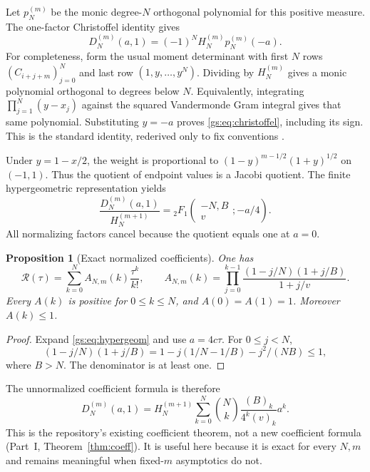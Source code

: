 \documentclass[11pt,a4paper]{article}
\numberwithin{equation}{section}
\newtheorem{proposition}[theorem]{Proposition}
\theoremstyle{definition}
\theoremstyle{remark}
\newcommand{\Rgs}{\mathcal R}
\begin{document}
Let $p_N^{(m)}$ be the monic degree-$N$ orthogonal polynomial for this
positive measure. The one-factor Christoffel identity gives
\begin{equation}\label{gs:eq:christoffel}
 D_N^{(m)}(a,1)=(-1)^N H_N^{(m)}p_N^{(m)}(-a).
\end{equation}
For completeness, form the usual moment determinant with first $N$ rows
$(C_{i+j+m})_{j=0}^N$ and last row $(1,y,\ldots,y^N)$. Dividing by
$H_N^{(m)}$ gives a monic polynomial orthogonal to degrees below $N$.
Equivalently, integrating $\prod_{j=1}^N(y-x_j)$ against the squared
Vandermonde Gram integral gives that same polynomial. Substituting $y=-a$
proves \eqref{gs:eq:christoffel}, including its sign. This is the standard
identity, rederived only to fix conventions \cite{Krattenthaler2023}.

Under $y=1-x/2$, the weight is proportional to
$(1-y)^{m-1/2}(1+y)^{1/2}$ on $(-1,1)$. Thus the quotient of endpoint
values is a Jacobi quotient. The finite hypergeometric representation
\cite[18.5.7]{DLMF} yields
\begin{equation}\label{gs:eq:hypergeom}
 \frac{D_N^{(m)}(a,1)}{H_N^{(m+1)}}
 ={}_2F_1\!\left(\begin{matrix}-N,B\\v\end{matrix};-a/4\right).
\end{equation}
All normalizing factors cancel because the quotient equals one at $a=0$.

\begin{proposition}[Exact normalized coefficients]\label{gs:prop:coefficients}
One has
\begin{equation}\label{gs:eq:coefficients}
 \Rgs(\tau)=\sum_{k=0}^N A_{N,m}(k)\frac{\tau^k}{k!},\qquad
 A_{N,m}(k)=\prod_{j=0}^{k-1}
       \frac{(1-j/N)(1+j/B)}{1+j/v}.
\end{equation}
Every $A(k)$ is positive for $0\le k\le N$, and $A(0)=A(1)=1$.
Moreover $A(k)\le1$.
\end{proposition}
\begin{proof}
Expand \eqref{gs:eq:hypergeom} and use $a=4c\tau$. For $0\le j<N$,
\[
 (1-j/N)(1+j/B)
 =1-j(1/N-1/B)-j^2/(NB)\le1,
\]
where $B>N$. The denominator is at least one.
\end{proof}

The unnormalized coefficient formula is therefore
\begin{equation}\label{gs:eq:repository-coeff}
 D_N^{(m)}(a,1)=H_N^{(m+1)}
 \sum_{k=0}^N\binom Nk\frac{(B)_k}{4^k(v)_k}a^k.
\end{equation}
This is the repository's existing coefficient theorem, not a new
coefficient formula (Part~I, Theorem~\ref{thm:coeff}). It is useful here
because it is exact for every $N,m$ and remains meaningful when fixed-$m$
asymptotics do not.
\end{document}
